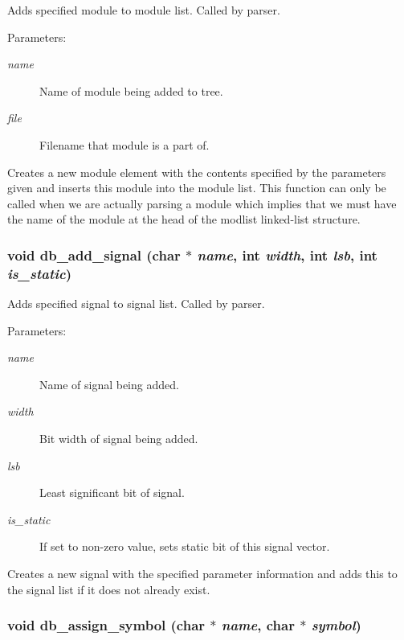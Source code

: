 Adds specified module to module list. Called by parser.

\begin{Desc}
\item[Parameters: ]\par
\begin{description}
\item[{\em 
name}]Name of module being added to tree. \item[{\em 
file}]Filename that module is a part of.\end{description}
\end{Desc}
Creates a new module element with the contents specified by the parameters given and inserts this module into the module list. This function can only be called when we are actually parsing a module which implies that we must have the name of the module at the head of the modlist linked-list structure. 
\subsubsection{\setlength{\rightskip}{0pt plus 5cm}void db\_\-add\_\-signal (char $\ast$ {\em name}, int {\em width}, int {\em lsb}, int {\em is\_\-static})}\label{db_8c_a18}


Adds specified signal to signal list. Called by parser.

\begin{Desc}
\item[Parameters: ]\par
\begin{description}
\item[{\em 
name}]Name of signal being added. \item[{\em 
width}]Bit width of signal being added. \item[{\em 
lsb}]Least significant bit of signal. \item[{\em 
is\_\-static}]If set to non-zero value, sets static bit of this signal vector.\end{description}
\end{Desc}
Creates a new signal with the specified parameter information and adds this to the signal list if it does not already exist. 
\subsubsection{\setlength{\rightskip}{0pt plus 5cm}void db\_\-assign\_\-symbol (char $\ast$ {\em name}, char $\ast$ {\em symbol})}\label{db_8c_a29}


